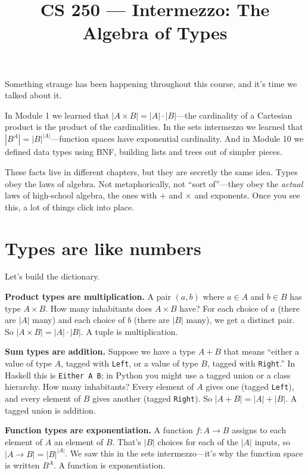 \documentclass[11pt]{article}
\title{CS 250 --- Intermezzo: The Algebra of Types}
\author{}
\date{}
\begin{document}
\maketitle

Something strange has been happening throughout this course, and it's time we talked about it.

In Module 1 we learned that $|A \times B| = |A| \cdot |B|$---the cardinality of a Cartesian product is the product of the cardinalities. In the sets intermezzo we learned that $|B^A| = |B|^{|A|}$---function spaces have exponential cardinality. And in Module 10 we defined data types using BNF, building lists and trees out of simpler pieces.

These facts live in different chapters, but they are secretly the same idea. Types obey the laws of algebra. Not metaphorically, not ``sort of''---they obey the \emph{actual} laws of high-school algebra, the ones with $+$ and $\times$ and exponents. Once you see this, a lot of things click into place.

\section{Types are like numbers}

Let's build the dictionary.

\medskip
\noindent\textbf{Product types are multiplication.} A pair $(a, b)$ where $a \in A$ and $b \in B$ has type $A \times B$. How many inhabitants does $A \times B$ have? For each choice of $a$ (there are $|A|$ many) and each choice of $b$ (there are $|B|$ many), we get a distinct pair. So $|A \times B| = |A| \cdot |B|$. A tuple is multiplication.

\medskip
\noindent\textbf{Sum types are addition.} Suppose we have a type $A + B$ that means ``either a value of type $A$, tagged with \texttt{Left}, or a value of type $B$, tagged with \texttt{Right}.'' In Haskell this is \texttt{Either A B}; in Python you might use a tagged union or a class hierarchy. How many inhabitants? Every element of $A$ gives one (tagged \texttt{Left}), and every element of $B$ gives another (tagged \texttt{Right}). So $|A + B| = |A| + |B|$. A tagged union is addition.

\medskip
\noindent\textbf{Function types are exponentiation.} A function $f : A \to B$ assigns to each element of $A$ an element of $B$. That's $|B|$ choices for each of the $|A|$ inputs, so $|A \to B| = |B|^{|A|}$. We saw this in the sets intermezzo---it's why the function space is written $B^A$. A function is exponentiation.
\end{document}
